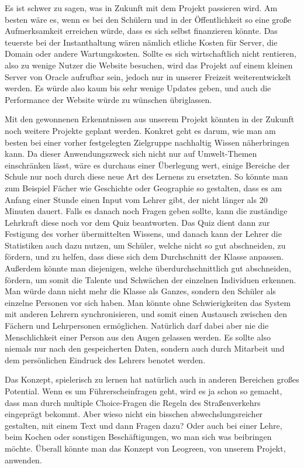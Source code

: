 Es ist schwer zu sagen, was in Zukunft mit dem Projekt passieren wird. Am besten wäre es, wenn es bei den Schülern und in der Öffentlichkeit so eine große Aufmerksamkeit erreichen würde, dass es sich selbst finanzieren könnte. Das teuerste bei der Instanthaltung wären nämlich etliche Kosten für Server, die Domain oder andere Wartungskosten. Sollte es sich wirtschaftlich nicht rentieren, also zu wenige Nutzer die Website besuchen, wird das Projekt auf einem kleinen Server von Oracle aufrufbar sein, jedoch nur in unserer Freizeit weiterentwickelt werden. Es würde also kaum bis sehr wenige Updates geben, und auch die Performance der Website würde zu wünschen übriglassen. 

 
 

Mit den gewonnenen Erkenntnissen aus unserem Projekt könnten in der Zukunft noch weitere Projekte geplant werden. Konkret geht es darum, wie man am besten bei einer vorher festgelegten Zielgruppe nachhaltig Wissen näherbringen kann. Da dieser Anwendungszweck sich nicht nur auf Umwelt-Themen einschränken lässt, wäre es durchaus einer Überlegung wert, einige Bereiche der Schule nur noch durch diese neue Art des Lernens zu ersetzten. So könnte man zum Beispiel Fächer wie Geschichte oder Geographie so gestalten, dass es am Anfang einer Stunde einen Input vom Lehrer gibt, der nicht länger als 20 Minuten dauert. Falls es danach noch Fragen geben sollte, kann die zuständige Lehrkraft diese noch vor dem Quiz beantworten. Das Quiz dient dann zur Festigung des vorher übermittelten Wissens, und danach kann der Lehrer die Statistiken auch dazu nutzen, um Schüler, welche nicht so gut abschneiden, zu fördern, und zu helfen, dass diese sich dem Durchschnitt der Klasse anpassen. Außerdem könnte man diejenigen, welche überdurchschnittlich gut abschneiden, fördern, um somit die Talente und Schwächen der einzelnen Individuen erkennen. Man würde dann nicht mehr die Klasse als Ganzes, sondern den Schüler als einzelne Personen vor sich haben. Man könnte ohne Schwierigkeiten das System mit anderen Lehrern synchronisieren, und somit einen Austausch zwischen den Fächern und Lehrpersonen ermöglichen. Natürlich darf dabei aber nie die Menschlichkeit einer Person aus den Augen gelassen werden. Es sollte also niemals nur nach den gespeicherten Daten, sondern auch durch Mitarbeit und dem persönlichen Eindruck des Lehrers benotet werden.   

 

Das Konzept, spielerisch zu lernen hat natürlich auch in anderen Bereichen großes Potential. Wenn es um Führerscheinfragen geht, wird es ja schon so gemacht, dass man durch multiple Choice-Fragen die Regeln des Straßenverkehrs eingeprägt bekommt. Aber wieso nicht ein bisschen abwechslungsreicher gestalten, mit einem Text und dann Fragen dazu? Oder auch bei einer Lehre, beim Kochen oder sonstigen Beschäftigungen, wo man sich was beibringen möchte. Überall könnte man das Konzept von Leogreen, von unserem Projekt, anwenden.  

